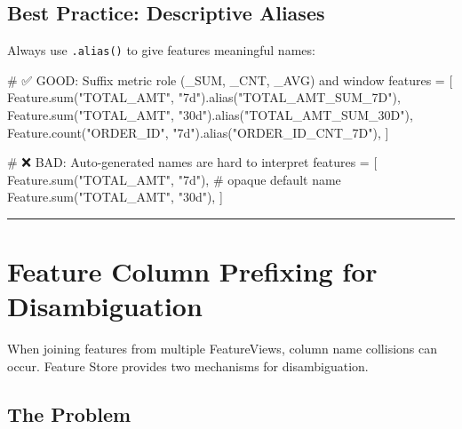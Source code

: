 \documentclass[
  letterpaper,
  DIV=11,
  numbers=noendperiod]{scrreprt}
\newenvironment{Shaded}{\begin{snugshade}}{\end{snugshade}}
\newcommand{\BuiltInTok}[1]{\textcolor[rgb]{0.00,0.23,0.31}{#1}}
\newcommand{\CommentTok}[1]{\textcolor[rgb]{0.37,0.37,0.37}{#1}}
\newcommand{\NormalTok}[1]{\textcolor[rgb]{0.00,0.23,0.31}{#1}}
\newcommand{\OperatorTok}[1]{\textcolor[rgb]{0.37,0.37,0.37}{#1}}
\newcommand{\StringTok}[1]{\textcolor[rgb]{0.13,0.47,0.30}{#1}}
\begin{document}
\hypertarget{best-practice-descriptive-aliases}{%
\subsection{Best Practice: Descriptive
Aliases}\label{best-practice-descriptive-aliases}}

Always use \texttt{.alias()} to give features meaningful names:

\begin{Shaded}
\begin{Highlighting}[]
\CommentTok{\# ✅ GOOD: Suffix metric role (\_SUM, \_CNT, \_AVG) and window}
\NormalTok{features }\OperatorTok{=}\NormalTok{ [}
\NormalTok{    Feature.}\BuiltInTok{sum}\NormalTok{(}\StringTok{"TOTAL\_AMT"}\NormalTok{, }\StringTok{"7d"}\NormalTok{).alias(}\StringTok{"TOTAL\_AMT\_SUM\_7D"}\NormalTok{),}
\NormalTok{    Feature.}\BuiltInTok{sum}\NormalTok{(}\StringTok{"TOTAL\_AMT"}\NormalTok{, }\StringTok{"30d"}\NormalTok{).alias(}\StringTok{"TOTAL\_AMT\_SUM\_30D"}\NormalTok{),}
\NormalTok{    Feature.count(}\StringTok{"ORDER\_ID"}\NormalTok{, }\StringTok{"7d"}\NormalTok{).alias(}\StringTok{"ORDER\_ID\_CNT\_7D"}\NormalTok{),}
\NormalTok{]}

\CommentTok{\# ❌ BAD: Auto{-}generated names are hard to interpret}
\NormalTok{features }\OperatorTok{=}\NormalTok{ [}
\NormalTok{    Feature.}\BuiltInTok{sum}\NormalTok{(}\StringTok{"TOTAL\_AMT"}\NormalTok{, }\StringTok{"7d"}\NormalTok{),  }\CommentTok{\# opaque default name}
\NormalTok{    Feature.}\BuiltInTok{sum}\NormalTok{(}\StringTok{"TOTAL\_AMT"}\NormalTok{, }\StringTok{"30d"}\NormalTok{),}
\NormalTok{]}
\end{Highlighting}
\end{Shaded}

\begin{center}\rule{0.5\linewidth}{0.5pt}\end{center}

\hypertarget{sec-prefixing}{%
\section{Feature Column Prefixing for
Disambiguation}\label{sec-prefixing}}

When joining features from multiple FeatureViews, column name collisions
can occur. Feature Store provides two mechanisms for disambiguation.

\hypertarget{the-problem}{%
\subsection{The Problem}\label{the-problem}}
\end{document}
